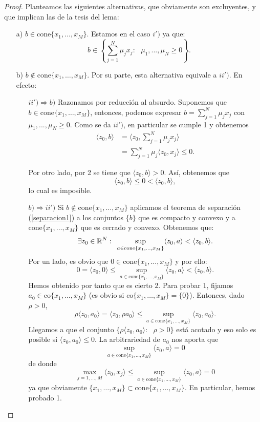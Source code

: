 \begin{proof}
Planteamos las siguientes alternativas, que obviamente son excluyentes, y que implican las de la tesis del lema:
\begin{itemize}
	\item[a)] $b \in \mathrm{cone}\{x_1,\dots, x_M \} $. Estamos en el caso $ i') $  ya que:
	\[
	b \in \left\lbrace \sum_{j=1}^{N}{\mu_j x_j } : \text{ } \mu_1,...,\mu_N \geq 0 \right\rbrace .
	\]
	\item[b)] $ b \notin \mathrm{cone}\{x_1,\dots, x_M \} $. Por su parte, esta alternativa equivale a $ ii') $. En efecto: 
	
	\begin{itemize}
	\item[$ ii') \Longrightarrow b) $] Razonamos por reducción al absurdo. Suponemos que $ b \in \mathrm{cone}\{x_1,\dots, x_M \} $, entonces, podemos expresar $ b =  \sum_{j=1}^{N}{\mu_j x_j } $ con $ \mu_1,...,\mu_N \geq 0$. Como se da $ ii') $, en particular se cumple 1 y obtenemos
	\begin{equation*}
	\begin{split}
		\langle z_0, b \rangle & = \langle z_0, \sum_{j=1}^{N}{\mu_j x_j } \rangle \\
		&= \sum_{j=1}^{N}{\mu_j\langle z_0, x_j \rangle } \leq 0.
	\end{split}
	\end{equation*}
	
	Por otro lado, por 2 se tiene que  $ \langle z_0, b\rangle > 0$. Así, obtenemos que
	\[
	\langle z_0, b \rangle \leq 0 <  \langle z_0, b \rangle,
	\]
	lo cual es imposible.
	\item[$ b) \Longrightarrow ii') $] Si $ b \notin \mathrm{cone}\{x_1,\dots, x_M \} $ aplicamos el teorema de separación (\ref{separacion1}) a los conjuntos $ \{b\} $ que es compacto y convexo y a $ \mathrm{cone}\{x_1,\dots, x_M \} $ que es cerrado y convexo. Obtenemos que:
	\[
	\exists z_0 \in \mathbb{R}^N: \text{ } \sup_{a \in \mathrm{cone}\{x_1,\dots, x_M \}} \langle z_0, a \rangle < \langle z_0, b \rangle.
	\]
	Por un lado, es obvio que $ 0 \in \mathrm{cone}\{x_1,\dots, x_M \} $ y por ello:
	\[
	0 = \langle z_0, 0\rangle \leq \sup_{a \in \mathrm{cone}\{x_1,\dots, x_M \}} \langle z_0, a \rangle < \langle z_0, b \rangle.
	\]
	Hemos obtenido por tanto que es cierto $ 2 $. Para probar $ 1 $, fijamos $ a_0 \in \mathrm{co}\{x_1,\dots, x_M \}$ (es obvio si $ \mathrm{co}\{x_1,\dots, x_M \} = \{0\}$). Entonces, dado $ \rho > 0 $,
	\[
	\rho\langle z_0, a_0 \rangle = \langle z_0, \rho a_0 \rangle \leq \sup_{a \in \mathrm{cone}\{x_1,\dots, x_M \}} \langle z_0, a_0 \rangle.
	\]
	Llegamos a que el conjunto $ \lbrace\rho\langle z_0, a_0 \rangle: \text{ } \rho > 0 \rbrace  $ está acotado y eso solo es posible si $ \langle z_0, a_0 \rangle \leq 0 $. La arbitrariedad de $ a_0 $ nos aporta que 
	\[ \sup_{a \in \mathrm{cone}\{x_1,\dots, x_M \}} \langle z_0, a \rangle= 0 \] de donde 
	\[
	\max_{ j=1,\dots,M} \langle z_0, x_j \rangle \leq \sup_{a \in \mathrm{cone}\{x_1,\dots, x_M \}} \langle z_0, a \rangle = 0  
	\]
	ya que obviamente $  \{x_1,\dots, x_M \} \subset \mathrm{cone}\{x_1,\dots, x_M \} $. En particular, hemos probado 1.
	\end{itemize}
\end{itemize}
\end{proof}